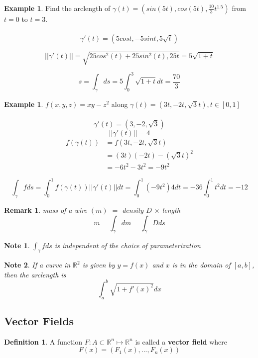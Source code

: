 \documentclass[12pt]{article}
\theoremstyle{plain}
\newtheorem*{remark}{Remark}
\newtheorem*{note}{Note}
\theoremstyle{definition}
\newtheorem{definition}[theorem]{Definition}
\newtheorem{example}[theorem]{Example}
\begin{document}
\begin{example}
	Find the arclength of $\gamma (t) = (sin(5t), cos(5t), \frac{10}{3} t^{1.5})$ from $t=0$ to $t=3$.\\
	\\
	$$\gamma ' (t) = (5cost, -5sint, 5 \sqrt{t})$$
	
	$$||\gamma ' (t)|| = \sqrt{25cos^2 (t) + 25sin^2 (t), 25 t} = 5\sqrt{1+t}$$
	
	$$s = \int_\gamma ds = 5 \int_0^3 \sqrt{1+t} dt = \frac{70}{3}$$
\end{example}

\begin{example}
	$f(x,y,z) = xy-z^2$ along $\gamma (t) = (3t, -2t, \sqrt{3}t), t\in [0,1]$\\
	\\
	$$\gamma ' (t) = (3, -2, \sqrt{3})$$
	$$||\gamma ' (t)|| = 4$$
	\begin{align*}
		f(\gamma (t)) &= f(3t, -2t, \sqrt{3}t)\\
		&=(3t)(-2t) - (\sqrt{3}t)^2\\
		&= -6t^2 - 3t^2 = -9t^2
	\end{align*}
	
	$$\int_\gamma f ds = \int_0^1 f(\gamma (t))||\gamma ' (t)||dt = \int_0^1 (-9t^2)4dt = -36 \int_0^1 t^2 dt = -12$$

\end{example}

\begin{remark}
	mass of a wire $(m)$ $=$ density $D$ $\times$ length
	$$m = \int_\gamma dm = \int_\gamma D ds$$
\end{remark}

\begin{note}
	$\int_\gamma f ds$ is independent of the choice of parameterization
\end{note}

\begin{note}
	If a curve in $\mathbb{R}^2$ is given by $y=f(x)$ and $x$ is in the domain of $[a,b]$, then the arclength is $$\int_a^b \sqrt{1+f'(x)^2} dx$$
\end{note}

\subsection{Vector Fields}

\begin{definition}
	A function $F:A \subset \mathbb{R}^n \mapsto \mathbb{R}^n$ is called a \textbf{vector field} where
	$$F(x) = (F_1(x), ..., F_n(x))$$
\end{definition}
\end{document}
